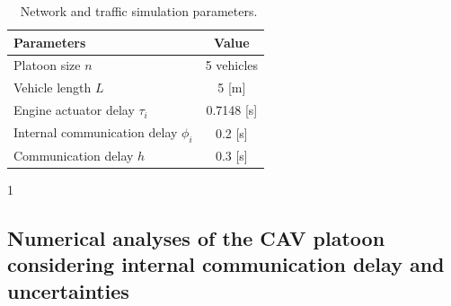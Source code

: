 \documentclass[journal]{IEEEtran}
\begin{document}
\begin{table}
  \centering
  \setlength{\abovecaptionskip}{0pt}
  \setlength{\belowcaptionskip}{10pt}%
  \begin{threeparttable}[b]
    \caption{~Network and traffic simulation parameters.}
    \label{table1}
    {\begin{tabular}{lc} \toprule
        Parameters                              & Value                \\ \midrule
        Platoon size $n$                        & 5 vehicles           \\
        Vehicle length $L$                      & 5 [m]                \\
        Engine actuator delay $\tau_i$          & 0.7148 [s]           \\
        Internal communication delay $\phi_{i}$ & 0.2 [s]              \\
        Communication delay $h$                 & 0.3 [s]    \tnote{1} \\
        \bottomrule
      \end{tabular}}
    \begin{tablenotes}
      \item[1] \citep{Vukadinovic2018a,Wang2018e}
    \end{tablenotes}
  \end{threeparttable}
\end{table}


\subsection{Numerical analyses of the CAV platoon considering internal communication delay and uncertainties}
\label{Section 5.2}
\end{document}
